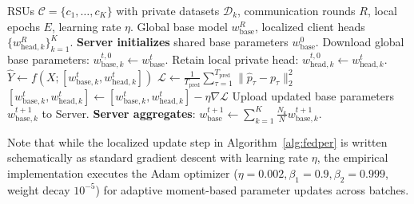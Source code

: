 \documentclass[journal]{IEEEtran}
\begin{document}
\begin{algorithm}[!t]
\caption{Personalized Federated Learning via FedPer for RSU Networks}
\label{alg:fedper}
\begin{algorithmic}[1]
\REQUIRE RSUs $\mathcal{C} = \{c_1, \dots, c_K\}$ with private datasets $\mathcal{D}_k$, communication rounds $R$, local epochs $E$, learning rate $\eta$.
\ENSURE Global base model $w_{\mathrm{base}}^R$, localized client heads $\{w_{\mathrm{head}, k}^R\}_{k=1}^K$.
\STATE \textbf{Server initializes} shared base parameters $w_{\mathrm{base}}^0$.
        \STATE Download global base parameters: $w_{\mathrm{base}, k}^{t, 0} \leftarrow w_{\mathrm{base}}^t$.
        \STATE Retain local private head: $w_{\mathrm{head}, k}^{t, 0} \leftarrow w_{\mathrm{head}, k}^t$.
                \STATE $\hat{Y} \leftarrow f(X; [w_{\mathrm{base}, k}^{t}, w_{\mathrm{head}, k}^{t}])$
                \STATE $\mathcal{L} \leftarrow \frac{1}{T_{\mathrm{pred}}} \sum_{\tau=1}^{T_{\mathrm{pred}}} \|\hat{p}_\tau - p_\tau\|_2^2$
                \STATE $[w_{\mathrm{base}, k}^{t}, w_{\mathrm{head}, k}^{t}] \leftarrow [w_{\mathrm{base}, k}^{t}, w_{\mathrm{head}, k}^{t}] - \eta \nabla \mathcal{L}$
            \ENDFOR
        \ENDFOR
        \STATE Upload updated base parameters $w_{\mathrm{base}, k}^{t+1}$ to Server.
    \ENDFOR
    \STATE \textbf{Server aggregates}: $w_{\mathrm{base}}^{t+1} \leftarrow \sum_{k=1}^K \frac{N_k}{N} w_{\mathrm{base}, k}^{t+1}$.
\ENDFOR
\end{algorithmic}
\end{algorithm}
Note that while the localized update step in Algorithm~\ref{alg:fedper} is written schematically as standard gradient descent with learning rate $\eta$, the empirical implementation executes the Adam optimizer ($\eta = 0.002, \beta_1 = 0.9, \beta_2 = 0.999$, weight decay $10^{-5}$) for adaptive moment-based parameter updates across batches.
\end{document}
